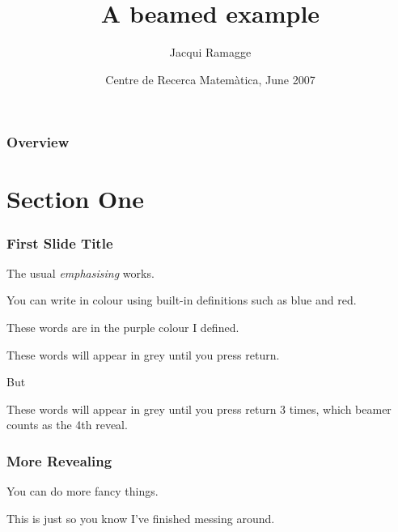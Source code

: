 \documentclass[]%
{beamer}
\title[A beamed example] %
{A beamed example}
\author[Jacqui Ramagge] %
{Jacqui Ramagge}
\institute[U of Wollongong] %
{The University of Wollongong}
\date[CRM, June 2007] %
{Centre de Recerca Matem\`atica, June 2007}
\begin{document}
\begin{frame}%
  \titlepage
\end{frame}


\begin{frame}%
\frametitle{Overview}\tableofcontents[hideallsubsections]%

\end{frame}

\section{Section One} %

\begin{frame}[label=First-slide]
\frametitle{First Slide Title}

The usual \emph{emphasising} works.

\bigskip
You can write in colour using built-in definitions such as
{\color{blue} blue} and {\color{red} red}.

\bigskip
{\color{purple} These words} are in the purple colour I defined.

\bigskip
\pause

These words will appear in grey until you press return.

\bigskip
But
\pause
{}

\bigskip
\pause
These words will appear in grey until you press return 3 times, which beamer counts as the 4th reveal.


\hfill\hyperlink{sample buttons<1>}{}


\end{frame}


\begin{frame}
\frametitle{More Revealing}

You can do more fancy things.

\bigskip
\pause
{}
\pause
{}

\bigskip
\pause
{}

\bigskip
\pause
{}

\bigskip
\pause
This is just so you know I've finished messing around.

\end{frame}
\end{document}
